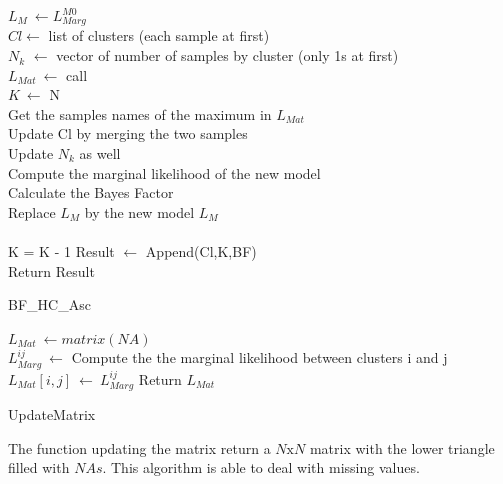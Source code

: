 \documentclass[twocolumn,12pt]{article}
\begin{document}
\begin{algorithm}[!]
 \BlankLine
 $L_M\ \leftarrow L_{Marg}^{M0}$\\
 $Cl \leftarrow$ list of clusters (each sample at first)\\
 $N_k$ $\leftarrow$ vector of number of samples by cluster (only 1s at first)\\
 $L_{Mat}\ \leftarrow$ call \\
 $K\ \leftarrow$ N\\
 \BlankLine
    {
        Get the samples names of the maximum in $L_{Mat}$\\
        Update Cl by merging the two samples\\
        Update $N_k$ as well\\
        Compute the marginal likelihood of the new model\\
        Calculate the Bayes Factor\\
        Replace $L_M$ by the new model $L_M$\\
        \\
        K = K - 1
        Result $\leftarrow$ Append(Cl,K,BF)\\
    }
    Return Result
 \caption{BF\_HC\_Asc}
\end{algorithm}
\begin{algorithm}[!]
 $L_{Mat}\ \leftarrow matrix(NA)$\\
    {
        {
            $L_{Marg}^{ij}\ \leftarrow$ Compute the the marginal likelihood between clusters i and j\\
            $L_{Mat}[i,j]\ \leftarrow\ L_{Marg}^{ij}$
        }
    }
    Return $L_{Mat}$
 \caption{UpdateMatrix}
\end{algorithm}
The function updating the matrix return a $N\text{x}N$ matrix with the lower triangle filled with $NAs$.
This algorithm is able to deal with missing values.
\end{document}
